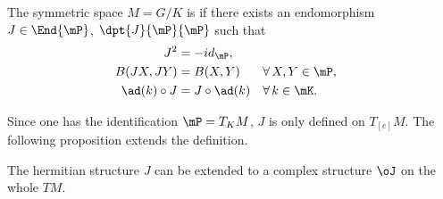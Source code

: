 \begin{definition}		\label{DefSymHermMGKalg}
	The symmetric space $M=G/K$ is  if there exists an endomorphism $J\in\End{\mP}$, $\dpt{J}{\mP}{\mP}$ such that
	\begin{subequations}
		\begin{align}
			J^2            & =-id_{\mP},                                           \label{eq:herm_1}                                               \\
			B(JX,JY)       & =B(X,Y)                                                                 &  & \forall\,X,Y\in\mP,    \label{eq:herm_2} \\
			\ad (k)\circ J & =J\circ\ad(k)                                                           &  & \forall\,k\in\mK.      \label{eq:herm_3}
		\end{align}
	\end{subequations}
	\label{def:hermitien}
\end{definition}

Since one has the identification $\mP=T_KM$, $J$ is only defined on $T_{[e]}M$. The following proposition extends the definition.

\begin{proposition} \label{prop:ext_J}
	The hermitian structure $J$ can be extended to a complex structure $\oJ$ on the whole $TM$.
\end{proposition}

